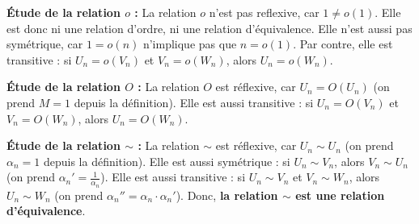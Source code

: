 \documentclass[12pt, a4paper]{report}
\begin{document}
\begin{property}
    \begin{outline}
        \1 \textbf{Étude de la relation $o$ :}
        \2 La relation $o$ n'est pas reflexive, car $1\ne o(1)$. Elle est donc ni une relation d'ordre, ni une relation d'équivalence.
        \2 Elle n'est aussi pas symétrique, car $1 = o(n)$ n'implique pas que $n = o(1)$.
        \2 Par contre, elle est transitive : si $U_n = o(V_n)$ et $V_n = o(W_n)$, alors $U_n = o(W_n)$.

        \1 \textbf{Étude de la relation $O$ :}
        \2 La relation $O$ est réflexive, car $U_n = O(U_n)$ (on prend $M=1$ depuis la définition).
        \2 Elle est aussi transitive : si $U_n = O(V_n)$ et $V_n = O(W_n)$, alors $U_n = O(W_n)$.

        \1 \textbf{Étude de la relation $\sim$ :}
        \2 La relation $\sim$ est réflexive, car $U_n \sim U_n$ (on prend $\alpha_n = 1$ depuis la définition).
        \2 Elle est aussi symétrique : si $U_n \sim V_n$, alors $V_n \sim U_n$ (on prend $\alpha_n' = \frac{1}{\alpha_n}$).
        \2 Elle est aussi transitive : si $U_n \sim V_n$ et $V_n \sim W_n$, alors $U_n \sim W_n$ (on prend $\alpha_n'' = \alpha_n \cdot \alpha_n'$).
        \2 Donc, \textbf{la relation $\sim$ est une relation d'équivalence}.
    \end{outline}
\end{property}
\end{document}
